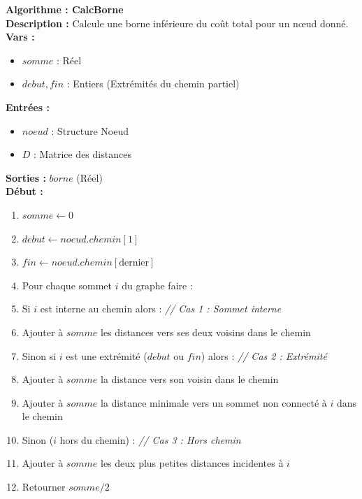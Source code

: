 \documentclass[a4paper, 12pt]{article}
\begin{document}
\begin{tcolorbox}[colback=darkWhite!75!white,colframe=black!30,left=5pt,right=5pt,top=5pt,bottom=5pt]
\textbf{Algorithme : CalcBorne} \\
\textbf{Description :} Calcule une borne inférieure du coût total pour un nœud donné. \\
\textbf{Vars :}
\begin{itemize}
    \item $somme$ : Réel
    \item $debut, fin$ : Entiers (Extrémités du chemin partiel)
\end{itemize}
\textbf{Entrées :}
\begin{itemize}
    \item $noeud$ : Structure Noeud
    \item $D$ : Matrice des distances
\end{itemize}
\textbf{Sorties :} $borne$ (Réel) \\
\textbf{Début :}
\begin{enumerate}
    \item $somme \leftarrow 0$
    \item $debut \leftarrow noeud.chemin[1]$
    \item $fin \leftarrow noeud.chemin[\text{dernier}]$
    \item Pour chaque sommet $i$ du graphe faire :
    \item \quad Si $i$ est interne au chemin alors : \textit{// Cas 1 : Sommet interne}
    \item \quad \quad Ajouter à $somme$ les distances vers ses deux voisins dans le chemin
    \item \quad Sinon si $i$ est une extrémité ($debut$ ou $fin$) alors : \textit{// Cas 2 : Extrémité}
    \item \quad \quad Ajouter à $somme$ la distance vers son voisin dans le chemin
    \item \quad \quad Ajouter à $somme$ la distance minimale vers un sommet non connecté à $i$ dans le chemin
    \item \quad Sinon ($i$ hors du chemin) : \textit{// Cas 3 : Hors chemin}
    \item \quad \quad Ajouter à $somme$ les deux plus petites distances incidentes à $i$
    \item Retourner $somme / 2$
\end{enumerate}
\end{tcolorbox}

\vspace{5mm}
\end{document}
